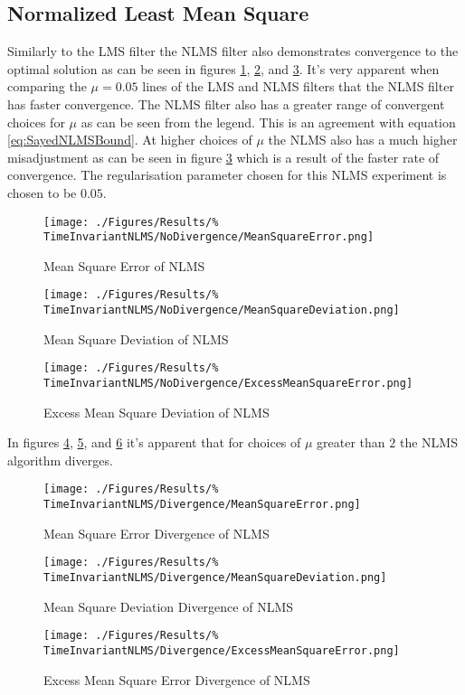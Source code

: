 \subsection{Normalized Least Mean Square}
\FloatBarrier
Similarly to the LMS filter the NLMS filter also demonstrates convergence %
to the optimal solution as can be seen in figures \ref{fig:NLMS-MSE}, %
\ref{fig:NLMS-MSD}, and \ref{fig:NLMS-EMSE}. It's very apparent when %
comparing the $\mu = 0.05$ lines of the LMS and NLMS filters that the %
NLMS filter has faster convergence. The NLMS filter also has a greater range of %
convergent choices for $\mu$ as can be seen from the legend. This is an agreement %
with equation \ref{eq:SayedNLMSBound}. At higher choices of $\mu$ the NLMS also has %
a much higher misadjustment as can be seen in figure \ref{fig:NLMS-EMSE} which is %
a result of the faster rate of convergence. The regularisation parameter chosen %
for this NLMS experiment is chosen to be $0.05$.
\begin{figure}[ht]
	\texttt{[image: ./Figures/Results/\%
	TimeInvariantNLMS/NoDivergence/MeanSquareError.png]}
	\caption{Mean Square Error of NLMS}
	\label{fig:NLMS-MSE}
\end{figure}
\begin{figure}[ht]
	\texttt{[image: ./Figures/Results/\%
	TimeInvariantNLMS/NoDivergence/MeanSquareDeviation.png]}
	\caption{Mean Square Deviation of NLMS}
	\label{fig:NLMS-MSD}
\end{figure}
\begin{figure}[ht]
	\texttt{[image: ./Figures/Results/\%
	TimeInvariantNLMS/NoDivergence/ExcessMeanSquareError.png]}
	\caption{Excess Mean Square Deviation of NLMS}
	\label{fig:NLMS-EMSE}
\end{figure}
In figures \ref{fig:NLMS-MSE-Diverge}, \ref{fig:NLMS-MSD-Diverge}, and %
\ref{fig:NLMS-EMSE-Diverge} it's apparent that for choices of $\mu$ greater %
than $2$ the NLMS algorithm diverges.
\begin{figure}[ht]
	\texttt{[image: ./Figures/Results/\%
	TimeInvariantNLMS/Divergence/MeanSquareError.png]}
	\caption{Mean Square Error Divergence of NLMS}
	\label{fig:NLMS-MSE-Diverge}
\end{figure}
\begin{figure}[ht]
	\texttt{[image: ./Figures/Results/\%
	TimeInvariantNLMS/Divergence/MeanSquareDeviation.png]}
	\caption{Mean Square Deviation Divergence of NLMS}
	\label{fig:NLMS-MSD-Diverge}
\end{figure}
\begin{figure}[ht]
	\texttt{[image: ./Figures/Results/\%
	TimeInvariantNLMS/Divergence/ExcessMeanSquareError.png]}
	\caption{Excess Mean Square Error Divergence of NLMS}
	\label{fig:NLMS-EMSE-Diverge}
\end{figure}

